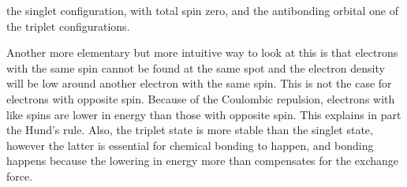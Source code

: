 the singlet configuration, with total spin zero, and the antibonding orbital one of the triplet configurations. \par
Another more elementary but more intuitive way to look at this is that electrons 
with the same spin cannot be found at the same spot and the electron density will be low around another electron with the same spin. This is not the case for electrons with opposite spin. Because of the Coulombic repulsion, electrons with like spins are lower in energy than those with opposite spin. This explains in part the Hund's rule. Also, the triplet state is more stable than the singlet state, however the latter is essential for chemical bonding to happen, and bonding happens because the lowering in energy more than compensates for the exchange force. 
